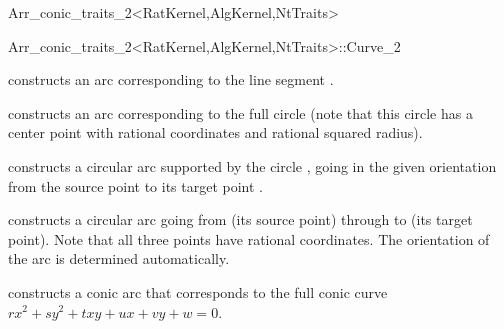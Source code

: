 \begin{ccRefClass}{Arr_conic_traits_2<RatKernel,AlgKernel,NtTraits>}
\begin{ccClass}{Arr_conic_traits_2<RatKernel,AlgKernel,NtTraits>::Curve_2}

\ccTypes



\ccCreation
{}

    {constructs an arc corresponding to the line segment .}

    {constructs an arc corresponding to the full circle 
     (note that this circle has a center point with rational coordinates
     and rational squared radius).}

    {constructs a circular arc supported by the circle , going
     in the given orientation  from the source point  to
     its target point .
     }

    {constructs a circular arc going from  (its source point)
     through  to  (its target point). Note that all three
     points have rational coordinates. The orientation of the arc is
     determined automatically.
     }

    {constructs a conic arc that corresponds to the full conic curve
     $r x^2 + s y^2 + t x y + u x + v y + w = 0$.
     }


\end{ccClass}
\end{ccRefClass}
